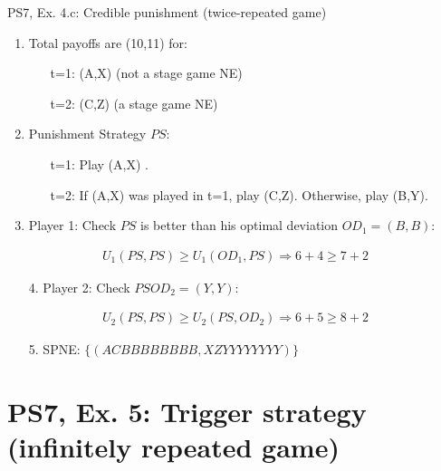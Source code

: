 \begin{frame}{PS7, Ex. 4.c: Credible punishment (twice-repeated game)}
\begin{multicols}{2}
\begin{enumerate}
      \item Total payoffs are (10,11) for:
      \begin{itemize}\normalsize
        \item[t=1:] (A,X) (not a stage game NE)
        \item[t=2:] (C,Z) (a stage game NE)
      \end{itemize}
      \item Punishment Strategy $PS$:
      \begin{itemize}\normalsize
        \item[t=1:] Play (A,X) .
        \item[t=2:] If (A,X) was played in t=1, play (C,Z). Otherwise, play (B,Y).
      \end{itemize}
      \item Player 1: Check $PS$ is better than his optimal deviation $OD_1=(B,B)$:
    \end{enumerate}
    \vspace{-14pt}
    \begin{align*}
        U_1(PS,PS)\geq U_1(OD_1,PS)\Rightarrow6+4\geq7+2%
    \end{align*}
    \vspace{-22pt}
    \begin{itemize}
        \item[4.] Player 2: Check $PS$\geq$OD_2=(Y,Y)$:
    \end{itemize}
    \vspace{-14pt}
    \begin{align*}
        U_2(PS,PS)\geq U_2(PS,OD_2)\Rightarrow6+5\geq8+2%
    \end{align*}
    \vspace{-22pt}
    \begin{itemize}
        \item[5.] SPNE: $\{(ACBBBBBBBB,XZYYYYYYYY)\}$
    \end{itemize}
    \vfill\null
  \end{multicols}
\end{frame}




\section{PS7, Ex. 5: Trigger strategy (infinitely repeated game)}

